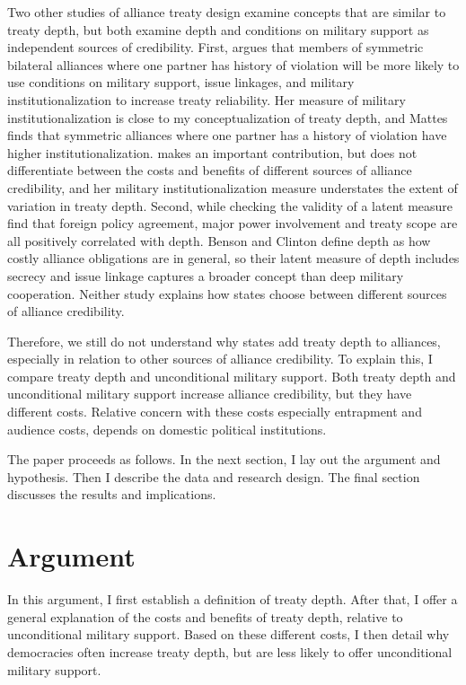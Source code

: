 \documentclass[12pt]{article}
\begin{document}
Two other studies of alliance treaty design examine concepts that are similar to treaty depth, but both examine depth and conditions on military support as independent sources of credibility.   
First, \citet{Mattes2012} argues that members of symmetric bilateral alliances where one partner has history of violation will be more likely to use conditions on military support, issue linkages, and military institutionalization to increase treaty reliability. 
Her measure of military institutionalization \citep{LeedsAnac2005} is close to my conceptualization of treaty depth, and Mattes finds that symmetric alliances where one partner has a history of violation have higher institutionalization.
\citet{Mattes2012} makes an important contribution, but does not differentiate between the costs and benefits of different sources of alliance credibility, and her military institutionalization measure understates the extent of variation in treaty depth.  
Second, while checking the validity of a latent measure \citet{BensonClinton2016} find that foreign policy agreement, major power involvement and treaty scope are all positively correlated with depth. 
Benson and Clinton define depth as how costly alliance obligations are in general, so their latent measure of depth includes secrecy and issue linkage captures a broader concept than deep military cooperation. 
Neither study explains how states choose between different sources of alliance credibility. 


Therefore, we still do not understand why states add treaty depth to alliances, especially in relation to other sources of alliance credibility. 
To explain this, I compare treaty depth and unconditional military support.  
Both treaty depth and unconditional military support increase alliance credibility, but they have different costs.
Relative concern with these costs especially entrapment and audience costs, depends on domestic political institutions. 


The paper proceeds as follows. 
In the next section, I lay out the argument and hypothesis. 
Then I describe the data and research design. 
The final section discusses the results and implications. 


\section{Argument}


In this argument, I first establish a definition of treaty depth.  
After that, I offer a general explanation of the costs and benefits of treaty depth, relative to unconditional military support. 
Based on these different costs, I then detail why democracies often increase treaty depth, but are less likely to offer unconditional military support. 
\end{document}
